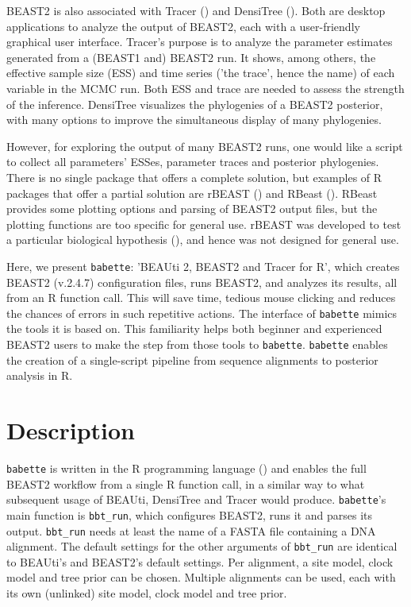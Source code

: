 BEAST2 is also associated with Tracer (\cite{tracer}) and 
DensiTree (\cite{DensiTree}). Both are desktop applications 
to analyze the output of BEAST2, each with a user-friendly graphical user interface. 
Tracer's purpose is to analyze the parameter estimates generated
from a (BEAST1 and) BEAST2 run. It shows, among
others, the effective sample size (ESS) and time series ('the trace', 
hence the name) of each variable in the MCMC run. Both ESS and trace
are needed to assess the strength of the inference. 
DensiTree visualizes the phylogenies of a BEAST2 posterior, with
many options to improve the simultaneous display of many phylogenies.

However, for exploring the output of many BEAST2 runs, one would like a
script to collect all parameters' ESSes, parameter traces and posterior
phylogenies. There is no single package that offers a complete solution,
but examples of R packages that offer a partial solution are rBEAST
(\cite{rBEAST_ratmann}) and RBeast (\cite{RBeast_faria}). RBeast provides some
plotting options and parsing of BEAST2 output files, but the plotting
functions are too specific for general use. rBEAST was developed to test a 
particular biological hypothesis (\cite{ratmann2016}), 
and hence was not designed for general use.

Here, we present \verb;babette;:
’BEAUti 2, BEAST2 and Tracer for R’, 
which creates BEAST2 (v.2.4.7) configuration files,
runs BEAST2, and analyzes its results,
all from an R function call. This
will save time, tedious mouse clicking and 
reduces the chances of errors in such repetitive actions.
The interface of \verb;babette; mimics the tools it
is based on. This
familiarity helps both beginner and experienced BEAST2 users 
to make the step from those tools to \verb;babette;.
\verb;babette; enables the creation of a single-script 
pipeline from sequence alignments to posterior analysis in R. 

\section{Description}

\verb;babette; is written in the R programming language (\cite{R})
and enables the full BEAST2 workflow from a single R function call,
in a similar way to what subsequent usage of BEAUti, DensiTree and Tracer would produce.
\verb;babette;'s main function is \verb;bbt_run;, which
configures BEAST2, runs it and parses its output. 
\verb;bbt_run; needs at least the name of a 
FASTA file containing a DNA alignment. 
The default settings for the other arguments of \verb;bbt_run; 
are identical to BEAUti's and BEAST2's default settings.
Per alignment, a site model, clock model and tree prior can be chosen.
Multiple alignments can be used, each with its own (unlinked) site model, 
clock model and tree prior.


